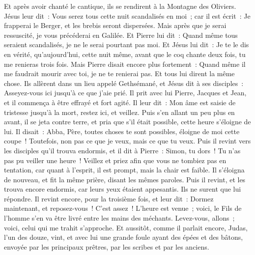 \begin{multicols}{2}
Et après avoir chanté le cantique, ils se rendirent à la Montagne des Oliviers.
Jésus leur dit~: Vous serez tous cette nuit scandalisés en moi~; car il est écrit~: Je frapperai le Berger, et les brebis seront dispersées.
Mais après que je serai ressuscité, je vous précéderai en Galilée.
Et Pierre lui dit~: Quand même tous seraient scandalisés, je ne le serai pourtant pas moi.
Et Jésus lui dit~: Je te le dis en vérité, qu'aujourd'hui, cette nuit même, avant que le coq chante deux fois, tu me renieras trois fois.
Mais Pierre disait encore plus fortement~: Quand même il me faudrait mourir avec toi, je ne te renierai pas. Et tous lui dirent la même chose.
Ils allèrent dans un lieu appelé Gethsémané, et Jésus dit à ses disciples~: Asseyez-vous ici jusqu'à ce que j'aie prié.
Il prit avec lui Pierre, Jacques et Jean, et il commença à être effrayé et fort agité.
Il leur dit~: Mon âme est saisie de tristesse jusqu'à la mort, restez ici, et veillez.
Puis s'en allant un peu plus en avant, il se jeta contre terre, et pria que s'il était possible, cette heure s'éloigne de lui.
Il disait~: Abba, Père, toutes choses te sont possibles, éloigne de moi cette coupe~! Toutefois, non pas ce que je veux, mais ce que tu veux.
Puis il revint vers les disciples qu'il trouva endormis, et il dit à Pierre~: Simon, tu dors~! Tu n'as pas pu veiller une heure~!
Veillez et priez afin que vous ne tombiez pas en tentation, car quant à l'esprit, il est prompt, mais la chair est faible.
Il s'éloigna de nouveau, et fit la même prière, disant les mêmes paroles.
Puis il revint, et les trouva encore endormis, car leurs yeux étaient appesantis. Ils ne surent que lui répondre.
Il revint encore, pour la troisième fois, et leur dit~: Dormez maintenant, et reposez-vous~! C'est assez~! L'heure est venue~; voici, le Fils de l'homme s'en va être livré entre les mains des méchants.
Levez-vous, allons~; voici, celui qui me trahit s'approche.
Et aussitôt, comme il parlait encore, Judas, l'un des douze, vint, et avec lui une grande foule ayant des épées et des bâtons, envoyée par les principaux prêtres, par les scribes et par les anciens.

\end{multicols}
